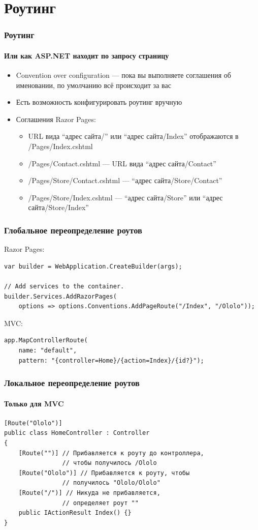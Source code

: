 \documentclass{../../slides-style}
\begin{document}
    \section{Роутинг}

    \begin{frame}
        \frametitle{Роутинг}
        \framesubtitle{Или как ASP.NET находит по запросу страницу}
        \begin{itemize}
            \item Convention over configuration --- пока вы выполняете соглашения об именовании, по умолчанию всё происходит за вас
            \item Есть возможность конфигурировать роутинг вручную
            \item Соглашения Razor Pages:
            \begin{itemize}
                \item URL вида ``адрес сайта/'' или ``адрес сайта/Index'' отображаются в /Pages/Index.cshtml
                \item /Pages/Contact.cshtml --- URL вида ``адрес сайта/Contact''
                \item /Pages/Store/Contact.cshtml --- ``адрес сайта/Store/Contact''
                \item /Pages/Store/Index.cshtml --- ``адрес сайта/Store'' или ``адрес сайта/Store/Index''
            \end{itemize}
        \end{itemize}
    \end{frame}

    \begin{frame}[fragile]
        \frametitle{Глобальное переопределение роутов}
        Razor Pages:
        \begin{verbatim}
var builder = WebApplication.CreateBuilder(args);

// Add services to the container.
builder.Services.AddRazorPages(
    options => options.Conventions.AddPageRoute("/Index", "/Ololo"));
        \end{verbatim}
        \vspace{5mm}
        MVC:
        \begin{verbatim}
app.MapControllerRoute(
    name: "default",
    pattern: "{controller=Home}/{action=Index}/{id?}");
        \end{verbatim}
    \end{frame}

    \begin{frame}[fragile]
        \frametitle{Локальное переопределение роутов}
        \framesubtitle{Только для MVC}
        \begin{verbatim}
[Route("Ololo")]
public class HomeController : Controller
{
    [Route("")] // Прибавляется к роуту до контроллера, 
                // чтобы получилось /Ololo
    [Route("Ololo")] // Прибавляется к роуту, чтобы 
                // получилось "Ololo/Ololo"
    [Route("/")] // Никуда не прибавляется,
                // определяет роут ""
    public IActionResult Index() {}
}
        \end{verbatim}
    \end{frame}
\end{document}
